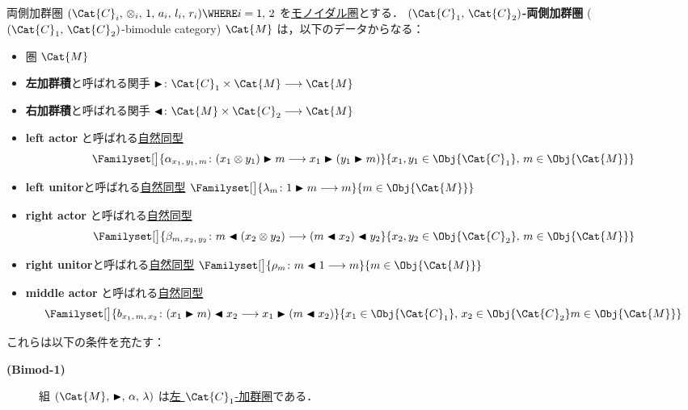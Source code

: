 \documentclass[TQFT_main]{subfiles}
\begin{document}
\begin{mydef}[label=def:bimodulecat,breakable]{両側加群圏}
    $(\Cat{C}_i,\, \otimes_i,\, 1,\, a_i,\, l_i,\, r_i) \WHERE i =1,\, 2$ を\hyperref[redef:monoidal-category]{モノイダル圏}とする．
    \textbf{$(\Cat{C}_1,\, \Cat{C}_2)$-両側加群圏} ($(\Cat{C}_1,\, \Cat{C}_2)$-bimodule category) $\Cat{M}$ は，以下のデータからなる：
    \begin{itemize}
        \item 圏 $\Cat{M}$
        \item \textbf{左加群積}と呼ばれる関手 $\btr \colon \Cat{C}_1 \times \Cat{M} \lto \Cat{M}$
        \item \textbf{右加群積}と呼ばれる関手 $\btl \colon \Cat{M} \times \Cat{C}_2 \lto \Cat{M}$
        \item \textbf{left actor} と呼ばれる\hyperref[def:nat]{自然同型}
        \begin{align}
            \Familyset[\big]{\alpha_{x_1,\, y_1,\, m} \colon (x_1 \otimes y_1) \btr m \lto x_1 \btr (y_1 \btr m)}{x_1,y_1\in \Obj{\Cat{C}_1},\, m \in \Obj{\Cat{M}}}
        \end{align}
        \item \textbf{left unitor}と呼ばれる\hyperref[def:nat]{自然同型} $\Familyset[\big]{\lambda_{m} \colon 1 \btr m \lto m}{m \in \Obj{\Cat{M}}}$
        \item \textbf{right actor} と呼ばれる\hyperref[def:nat]{自然同型}
        \begin{align}
            \Familyset[\big]{\beta_{m,\, x_2,\, y_2} \colon m \btl (x_2 \otimes y_2) \lto  (m \btl x_2) \btl y_2}{x_2,y_2 \in \Obj{\Cat{C}_2},\, m \in \Obj{\Cat{M}}}
        \end{align}
        \item \textbf{right unitor}と呼ばれる\hyperref[def:nat]{自然同型} $\Familyset[\big]{\rho_{m} \colon m \btl 1 \lto m}{m \in \Obj{\Cat{M}}}$
        \item \textbf{middle actor} と呼ばれる\hyperref[def:nat]{自然同型}
        \begin{align}
            \Familyset[\big]{b_{x_1,\,m,\, x_2} \colon (x_1 \btr m) \btl x_2 \lto  x_1 \btr (m \btl x_2)}{x_1 \in \Obj{\Cat{C}_1},\, x_2 \in \Obj{\Cat{C}_2} m \in \Obj{\Cat{M}}}
        \end{align}
    \end{itemize}
    これらは以下の条件を充たす：
    \begin{description}
        \item[\textbf{(Bimod-1)}] 組 $(\Cat{M},\, \btr,\, \alpha,\, \lambda)$ は\hyperref[def:modulecat]{左 $\Cat{C}_1$-加群圏}である．

\end{description}
\end{mydef}
\end{document}
